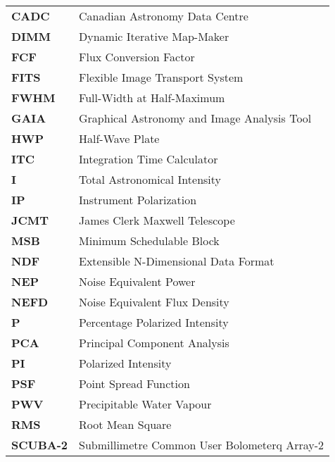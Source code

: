 \documentclass[11pt,oneside,chapters]{starlink}
\begin{document}
\scfrontmatter

\newcommand{\xparam}[2]{\hyperref[#1]{\param{#2}}}
\newcommand{\setparam}[3]{\xparam{#1}{#2}\param{~=~#3}}

\newcommand{\jsageneric}{\htmladdnormallink{\file{dimmconfig\_jsa\_generic}}
{https://raw.githubusercontent.com/Starlink/starlink/master/applications/smurf/examples/dimmconfig_jsa_generic.lis}}



\Acronyms

\begin{table}[h!]
\begin{tabular}{ll}
\textbf{CADC}   & Canadian Astronomy Data Centre\\
\textbf{DIMM}   & Dynamic Iterative Map-Maker\\
\textbf{FCF}    & Flux Conversion Factor\\
\textbf{FITS}   & Flexible Image Transport System\\
\textbf{FWHM}   & Full-Width at Half-Maximum\\
\textbf{GAIA}   & Graphical Astronomy and Image Analysis Tool\\
\textbf{HWP}    & Half-Wave Plate\\
\textbf{ITC}    & Integration Time Calculator\\
\textbf{I}      & Total Astronomical Intensity \\
\textbf{IP}     & Instrument Polarization \\
\textbf{JCMT}   & James Clerk Maxwell Telescope\\
\textbf{MSB}    & Minimum Schedulable Block\\
\textbf{NDF}    & Extensible N-Dimensional Data Format\\
\textbf{NEP}    & Noise Equivalent Power\\
\textbf{NEFD}   & Noise Equivalent Flux Density\\
\textbf{P}      & Percentage Polarized Intensity \\
\textbf{PCA}    & Principal Component Analysis \\
\textbf{PI}     & Polarized Intensity \\
\textbf{PSF}    & Point Spread Function\\
\textbf{PWV}    & Precipitable Water Vapour\\
\textbf{RMS}    & Root Mean Square\\
\textbf{SCUBA-2}& Submillimetre Common User Bolometerq Array-2\\

\end{tabular}
\end{table}
\end{document}
